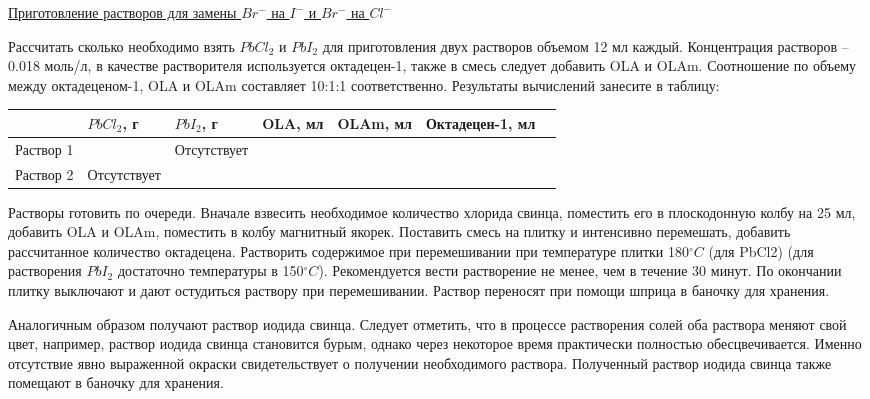 \underline{Приготовление растворов для замены $Br^-$ на $I^-$ и $Br^-$ на $Cl^-$}

Рассчитать сколько необходимо взять $PbCl_2$ и $PbI_2$ для приготовления двух растворов объемом 12 мл каждый. Концентрация растворов – 0.018 моль/л, в качестве растворителя используется октадецен-1, также в смесь следует добавить OLA и OLAm. Соотношение по объему между октадеценом-1, OLA и OLAm составляет 10:1:1 соответственно. Результаты вычислений занесите в таблицу:

\begin{table}[H]
    \begin{center}
        \begin{tabular}{|p{2.3cm}|p{2.3cm}|p{2.3cm}|p{2.3cm}|p{2.3cm}|p{2.3cm}|p{2.3cm}|}
            \hline
            &\cellcolor[HTML]{C0C0C0}$PbCl_2$, г	& \cellcolor[HTML]{C0C0C0}$PbI_2$, г	&\cellcolor[HTML]{C0C0C0}OLA, мл	&\cellcolor[HTML]{C0C0C0}OLAm, мл	&\cellcolor[HTML]{C0C0C0}Октадецен-1, мл \\
            \hline
            \cellcolor[HTML]{C0C0C0} Раствор 1	&  & \cellcolor[HTML]{C0C0C0}Отсутствует & & & \\
            \hline
            \cellcolor[HTML]{C0C0C0}Раствор 2& \cellcolor[HTML]{C0C0C0}Отсутствует& & & & \\
            \hline
        \end{tabular}
    \end{center}
\end{table}

Растворы готовить по очереди. Вначале взвесить необходимое количество хлорида свинца, поместить его в плоскодонную колбу на 25 мл, добавить OLA и OLAm, поместить в колбу магнитный якорек. Поставить смесь на плитку и интенсивно перемешать, добавить рассчитанное количество октадецена. Растворить содержимое при перемешивании при температуре плитки 180$^\circ C$ (для PbCl2) (для растворения $PbI_2$ достаточно температуры в 150$^\circ C$). Рекомендуется вести растворение не менее, чем в течение 30 минут. По окончании плитку выключают и дают остудиться раствору при перемешивании. Раствор переносят при помощи шприца в баночку для хранения.

Аналогичным образом получают раствор иодида свинца. Следует отметить, что в процессе растворения солей оба раствора меняют свой цвет, например, раствор иодида свинца становится бурым, однако через некоторое время практически полностью обесцвечивается. Именно отсутствие явно выраженной окраски свидетельствует о получении необходимого раствора. Полученный раствор иодида свинца также помещают в баночку для хранения.

